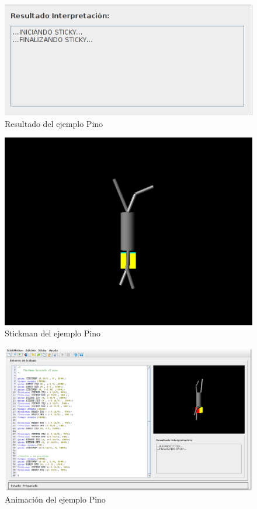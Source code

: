 \documentclass[a4paper, 12pt]{book}
\begin{document}
\begin{itemize}
\begin{figure}[htb]
  \centerline{\includegraphics[width=\textwidth]{./imagenes/pino1-resultado.png}}
  \caption{Resultado del ejemplo Pino}
\end{figure}


\begin{figure}[htb]
  \centerline{\includegraphics[width=\textwidth]{./imagenes/pino1-stickman.png}}
  \caption{Stickman del ejemplo Pino}
\end{figure}



\begin{figure}[htb]
  \centerline{\includegraphics[width=\textwidth]{./imagenes/pino2.png}}
  \caption{Animación del ejemplo Pino}
\end{figure}



\end{itemize}
\end{document}
